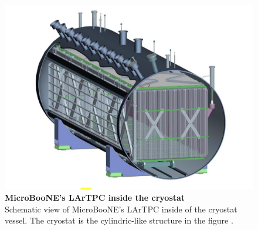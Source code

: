 \begin{figure}[h!]
    \begin{center}
        \includegraphics[scale=0.35]{Figures/uboone_cryo.png}
        \caption[MicroBooNE's LArTPC inside the cryostat]{{\textbf{MicroBooNE's LArTPC inside the cryostat}} \\ Schematic view of MicroBooNE's LArTPC inside of the cryostat vessel. The cryostat is the cylindric-like structure in the figure \cite{microboone_design}.}
        \label{uboone_cryo} 
    \end{center}
\end{figure}
%
